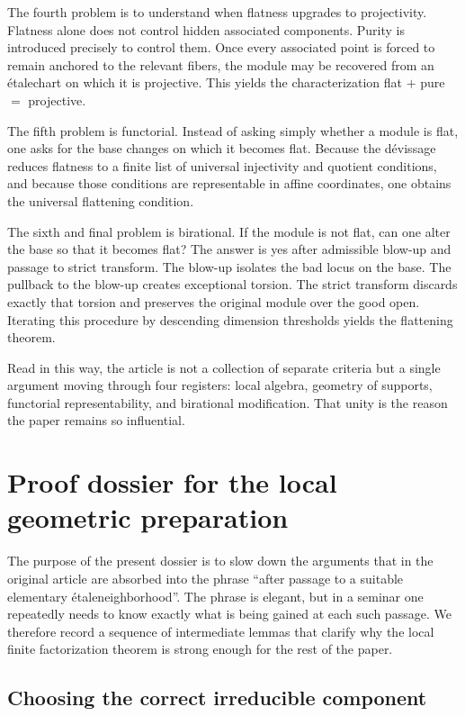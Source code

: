 \documentclass[11pt,oneside]{article}
\newcommand{\etale}{\'etale}
\begin{document}
The fourth problem is to understand when flatness upgrades to projectivity.  Flatness alone does not control hidden associated components.  Purity is introduced precisely to control them.  Once every associated point is forced to remain anchored to the relevant fibers, the module may be recovered from an \etale chart on which it is projective.  This yields the characterization flat $+$ pure $=$ projective.

The fifth problem is functorial.  Instead of asking simply whether a module is flat, one asks for the base changes on which it becomes flat.  Because the d\'evissage reduces flatness to a finite list of universal injectivity and quotient conditions, and because those conditions are representable in affine coordinates, one obtains the universal flattening condition.

The sixth and final problem is birational.  If the module is not flat, can one alter the base so that it becomes flat?  The answer is yes after admissible blow-up and passage to strict transform.  The blow-up isolates the bad locus on the base.  The pullback to the blow-up creates exceptional torsion.  The strict transform discards exactly that torsion and preserves the original module over the good open.  Iterating this procedure by descending dimension thresholds yields the flattening theorem.

Read in this way, the article is not a collection of separate criteria but a single argument moving through four registers: local algebra, geometry of supports, functorial representability, and birational modification.  That unity is the reason the paper remains so influential.




\section{Proof dossier for the local geometric preparation}

The purpose of the present dossier is to slow down the arguments that in the original article are absorbed into the phrase \enquote{after passage to a suitable elementary \etale neighborhood}.  The phrase is elegant, but in a seminar one repeatedly needs to know exactly what is being gained at each such passage.  We therefore record a sequence of intermediate lemmas that clarify why the local finite factorization theorem is strong enough for the rest of the paper.

\subsection{Choosing the correct irreducible component}
\end{document}
